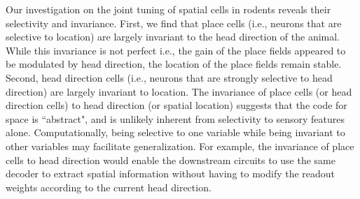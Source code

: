 \documentclass[11pt]{article}
\begin{document}
Our investigation on the joint tuning of spatial cells in rodents reveals their selectivity and invariance. First, we find that place cells (i.e., neurons that are selective to location) are largely invariant to the head direction of the animal. While this invariance is not perfect i.e., the gain of the place fields appeared to be modulated by head direction, the location of the place fields remain stable. 
Second, head direction cells (i.e., neurons that are strongly selective to head direction) are largely invariant to location.  
The invariance of place cells (or head direction cells) to head direction (or spatial location) suggests that the code for space is ``abstract", and is unlikely inherent from selectivity to sensory features alone. Computationally, being selective to one variable while being invariant to other variables may facilitate generalization. For example, the invariance of place cells to head direction would enable the downstream circuits to use the same decoder to extract spatial information without having to modify the readout weights according to the current head direction.
\end{document}
